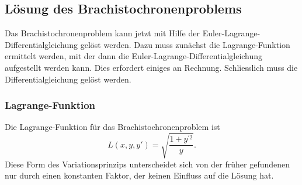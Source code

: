 %
%
%

%
%
\subsection{Lösung des Brachistochronenproblems
\label{buch:variation:eulerlagrange:subsection:brachistochrone}}
Das Brachistochronenproblem kann jetzt mit Hilfe der
Euler-Lagrange-Differential\-glei\-chung gelöst werden.
Dazu muss zunächst die Lagrange-Funktion ermittelt werden,
mit der dann die Euler-Lagrange-Differentialgleichung aufgestellt
werden kann.
Dies erfordert einiges an Rechnung.
Schliesslich muss die Differentialgleichung gelöst werden.

%
%
\subsubsection{Lagrange-Funktion}
Die Lagrange-Funktion für das Brachistochronenproblem ist
\[
L(x,y,y')
=
\sqrt{\frac{1+y^{\prime 2}}{y}}.
\]
Diese Form des Variationsprinzips unterscheidet sich von der früher
gefundenen nur durch einen konstanten Faktor, der keinen Einfluss
auf die Lösung hat.

%
%
